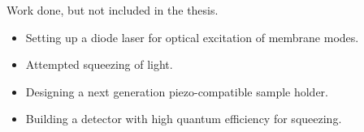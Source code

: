 Work done, but not included in the thesis.

\begin{itemize}
\item Setting up a diode laser for optical excitation of membrane modes.
\item Attempted squeezing of light.
\item Designing a next generation piezo-compatible sample holder.
\item Building a detector with high quantum efficiency for squeezing.
\end{itemize}